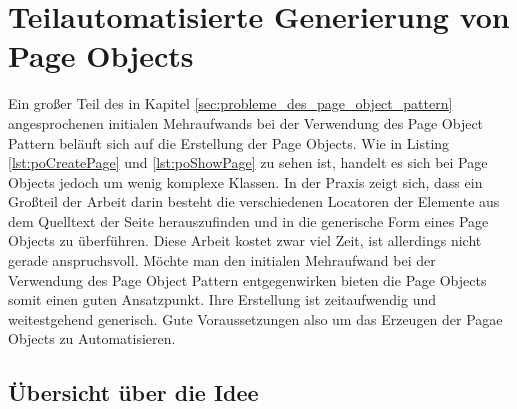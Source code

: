 
\chapter{Teilautomatisierte Generierung von Page Objects}
\label{sec:teilautomatisierte_generierung_von_pageObjects}

Ein großer Teil des in Kapitel \ref{sec:probleme_des_page_object_pattern} angesprochenen initialen Mehraufwands bei der Verwendung des Page Object Pattern beläuft sich auf die Erstellung der Page Objects.
Wie in Listing \ref{lst:poCreatePage} und \ref{lst:poShowPage} zu sehen ist, handelt es sich bei Page Objects jedoch um wenig komplexe Klassen. In der Praxis zeigt sich, dass ein Großteil der Arbeit darin besteht die verschiedenen Locatoren der Elemente aus dem Quelltext der Seite herauszufinden und in die generische Form eines Page Objects zu überführen.
Diese Arbeit kostet zwar viel Zeit, ist allerdings nicht gerade anspruchsvoll.
Möchte man den initialen Mehraufwand bei der Verwendung des Page Object Pattern entgegenwirken bieten die Page Objects somit einen guten Ansatzpunkt.
Ihre Erstellung ist zeitaufwendig und weitestgehend generisch. Gute Voraussetzungen also um das Erzeugen der Pagae Objects zu Automatisieren.
\section{Übersicht über die Idee}
\label{sec:uebersicht_ueber_idee}



